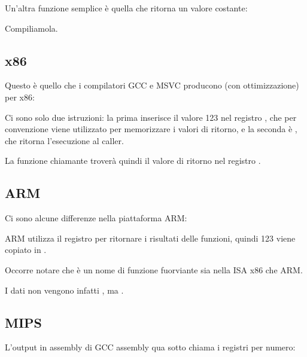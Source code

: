 \label{ret_val_func}

Un'altra funzione semplice è quella che ritorna un valore costante:



Compiliamola.

\subsection{x86}

Questo è quello che i compilatori GCC e MSVC producono (con ottimizzazione) per x86:



Ci sono solo due istruzioni: la prima inserisce il valore 123 nel registro \EAX,
che per convenzione viene utilizzato per memorizzare i valori di ritorno,
e la seconda è \RET, che ritorna l'esecuzione al \gls{caller}.

La funzione chiamante troverà quindi il valore di ritorno nel registro \EAX.

\subsection{ARM}

Ci sono alcune differenze nella piattaforma ARM:



ARM utilizza il registro  per ritornare i risultati delle funzioni, quindi 123 viene copiato in .

Occorre notare che \MOV è un nome di funzione fuorviante sia nella \ac{ISA} x86 che ARM.

I dati non vengono infatti , ma .

\subsection{MIPS}

\label{MIPS_leaf_function_ex1}

L'output in assembly di GCC assembly qua sotto chiama i registri per numero:



